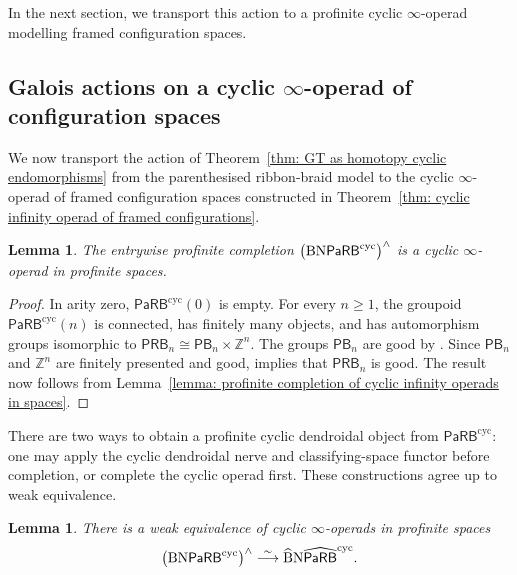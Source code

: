 \documentclass{amsart}
\newcommand{\PaRB}{\mathsf{PaRB}}
\newcommand{\cs}{\textnormal{B}}
\newcommand{\nerve}{\textnormal{N}}
\newcommand{\PB}{\mathsf{PB}} %
\newcommand{\PRB}{\mathsf{PRB}} %
\newtheorem{lemma}[theorem]{Lemma}%
\theoremstyle{definition}
\numberwithin{equation}{section}
\begin{document}
In the next section, we transport this action to a profinite cyclic
$\infty$-operad modelling framed configuration spaces.

\subsection{Galois actions on a cyclic
\texorpdfstring{$\infty$}{infinity}-operad of configuration spaces}
\label{subsec: Galois action on cyclic infinity conf space}

We now transport the action of
Theorem~\ref{thm: GT as homotopy cyclic endomorphisms} from the
parenthesised ribbon-braid model to the cyclic $\infty$-operad of
framed configuration spaces constructed in
Theorem~\ref{thm: cyclic infinity operad of framed configurations}.

\begin{lemma}
\label{lem: csNPaRB is profinite cyclic infty operad}
The entrywise profinite completion
$\bigl(\cs\nerve\PaRB^{\mathrm{cyc}}\bigr)^{\wedge}$ is a cyclic
$\infty$-operad in profinite spaces.
\end{lemma}

\begin{proof}
In arity zero, $\PaRB^{\mathrm{cyc}}(0)$ is empty. For every
$n\geq1$, the groupoid $\PaRB^{\mathrm{cyc}}(n)$ is connected, has
finitely many objects, and has automorphism groups isomorphic to
$\PRB_n\cong\PB_n\times\mathbb Z^n$. The groups $\PB_n$ are good by
\cite[Corollary~5.11]{Horel_profinite_groupoids}. Since $\PB_n$ and
$\mathbb Z^n$ are finitely presented and good,
\cite[Corollary~5.12]{Horel_profinite_groupoids} implies that
$\PRB_n$ is good. The result now follows from
Lemma~\ref{lemma: profinite completion of cyclic infinity operads in spaces}.
\end{proof}

There are two ways to obtain a profinite cyclic dendroidal object
from $\PaRB^{\mathrm{cyc}}$: one may apply the cyclic dendroidal
nerve and classifying-space functor before completion, or complete
the cyclic operad first. These constructions agree up to weak
equivalence.

\begin{lemma}
\label{lem:comparison cyclic PaRB nerves}
There is a weak equivalence of cyclic $\infty$-operads in profinite
spaces
\[
\bigl(\cs\nerve\PaRB^{\mathrm{cyc}}\bigr)^{\wedge}
\overset{\sim}{\longrightarrow}
\widehat{\cs}\nerve\widehat{\PaRB}^{\mathrm{cyc}}.
\]
\end{lemma}
\end{document}
